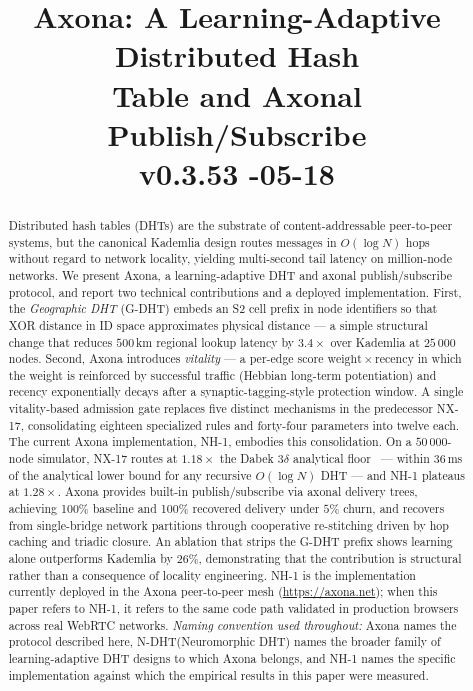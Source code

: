 \documentclass[conference]{IEEEtran}
\title{Axona: A Learning-Adaptive Distributed Hash\\Table and Axonal Publish/Subscribe\\[0.3em]{\normalsize\normalfont v0.3.53 \quad 2026-05-18}}
\author{
\IEEEauthorblockN{David A. Smith}
\IEEEauthorblockA{Axona.net\\
\texttt{davidasmith@gmail.com}}
}
\newcommand{\axona}{Axona\xspace}
\newcommand{\nhone}{NH-1\xspace}
\newcommand{\NDHT}{N-DHT\xspace}
\newcommand{\GDHT}{G-DHT\xspace}
\newcommand{\NXseventeen}{NX-17\xspace}
\begin{document}
\maketitle
\pagestyle{plain}
\thispagestyle{plain}

\begin{abstract}
Distributed hash tables (DHTs) are the substrate of content-addressable
peer-to-peer systems, but the canonical Kademlia design routes messages in
$O(\log N)$ hops without regard to network locality, yielding multi-second
tail latency on million-node networks. We present \axona, a learning-adaptive
DHT and axonal publish/subscribe protocol, and report two technical
contributions and a deployed implementation. First, the \emph{Geographic DHT}
(\GDHT) embeds an S2 cell prefix in node identifiers so that XOR distance in
ID space approximates physical distance --- a simple structural change that
reduces $500$\,km regional lookup latency by $3.4\times$ over Kademlia at
$25\,000$ nodes. Second, \axona introduces \emph{vitality} --- a per-edge
score $\mathrm{weight} \times \mathrm{recency}$ in which the weight is
reinforced by successful traffic (Hebbian long-term potentiation) and
recency exponentially decays after a synaptic-tagging-style protection
window. A single vitality-based admission gate replaces five distinct
mechanisms in the predecessor \NXseventeen, consolidating eighteen
specialized rules and forty-four parameters into twelve each. The current
\axona implementation, \nhone, embodies this consolidation. On a
$50\,000$-node simulator, \NXseventeen routes at $1.18\times$ the Dabek
$3\delta$ analytical floor~\cite{dabek2004designing} --- within $36$\,ms
of the analytical lower bound for any recursive $O(\log N)$ DHT --- and
\nhone plateaus at $1.28\times$. \axona provides built-in publish/subscribe
via axonal delivery trees, achieving 100\% baseline and 100\% recovered
delivery under $5\%$ churn, and recovers from single-bridge network
partitions through cooperative re-stitching driven by hop caching and
triadic closure. An ablation that strips the \GDHT prefix shows learning
alone outperforms Kademlia by $26\%$, demonstrating that the contribution
is structural rather than a consequence of locality engineering. \nhone is
the implementation currently deployed in the \axona peer-to-peer mesh
(\url{https://axona.net}); when this paper refers to \nhone, it refers to
the same code path validated in production browsers across real WebRTC
networks. \emph{Naming convention used throughout:} \axona names the
protocol described here, \NDHT (Neuromorphic DHT) names the broader
family of learning-adaptive DHT designs to which \axona belongs, and
\nhone names the specific implementation against which the empirical
results in this paper were measured.
\end{abstract}
\end{document}
